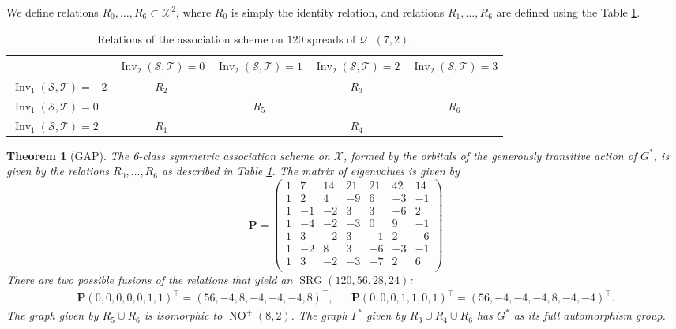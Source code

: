 \documentclass[a4paper]{article}
\newtheorem{thm}{Theorem}[section]
\theoremstyle{definition}
\newcommand{\mq}{\mathcal Q}
\newcommand{\ms}{\mathcal S}
\newcommand{\mt}{\mathcal T}
\newcommand{\mx}{\mathcal X}
\DeclareMathOperator{\NO}{NO}
\newcommand{\nono}{\overline{\NO^+}(8,2)}
\newcommand{\BP}{\boldsymbol P}
\DeclareMathOperator{\SRG}{SRG}
\DeclareMathOperator{\Inv}{Inv}
\begin{document}
We define relations $R_0, \dots, R_6 \subset \mx^2$, where $R_0$ is simply the identity relation, and relations $R_1, \dots, R_6$ are defined using the Table \ref{tab:Assoc1}.

\begin{table}[h!]
 \centering
 \begin{tabular}{|l||c | c | c | c|}
  \hline
  & $\Inv_2(\ms,\mt) = 0$ & $\Inv_2(\ms,\mt) = 1$ & $\Inv_2(\ms,\mt) = 2$ & $\Inv_2(\ms,\mt) = 3$  \\ \hline \hline
  $\Inv_1(\ms,\mt) = -2$ & $R_2$ & & $R_3$ & \\ \hline
  $\Inv_1(\ms,\mt) = 0$ & & $R_5$ & & $R_6$ \\ \hline
  $\Inv_1(\ms,\mt) = 2$ & $R_1$ & & $R_4$ & \\ \hline
 \end{tabular}
 \caption{Relations of the association scheme on $120$ spreads of $\mq^+(7,2)$.}
 \label{tab:Assoc1}
\end{table}

\begin{thm}[GAP]
 \label{Thm:Assoc:Spreads}
 The 6-class symmetric association scheme on $\mx$, formed by the orbitals of the generously transitive action of $G^*$, is given by the relations $R_0, \dots, R_6$ as described in Table \ref{tab:Assoc1}.
 The matrix of eigenvalues is given by
 \[
  \BP = \begin{pmatrix}
1 & 7 & 14 & 21 & 21 & 42 & 14\\
1 & 2 & 4 & -9 & 6 & -3 & -1\\
1 & -1 & -2 & 3 & 3 & -6 & 2\\
1 & -4 & -2 & -3 & 0 & 9 & -1\\
1 & 3 & -2 & 3 & -1 & 2 & -6\\
1 & -2 & 8 & 3 & -6 & -3 & -1\\
1 & 3 & -2 & -3 & -7 & 2 & 6\\
\end{pmatrix}
 \]
 There are two possible fusions of the relations that yield an $\SRG(120,56,28,24)$:
\begin{align*}
 \BP (0,0,0,0,0,1,1)^\top
 = (56,-4,8,-4,-4,-4,8)^\top, &&
 \BP (0,0,0,1,1,0,1)^\top
 = (56,-4,-4,-4,8,-4,-4)^\top.
\end{align*}
 The graph given by $R_5 \cup R_6$ is isomorphic to $\nono$.
 The graph $\Gamma^*$ given by $R_3 \cup R_4 \cup R_6$ has $G^*$ as its full automorphism group.
\end{thm}
\end{document}
